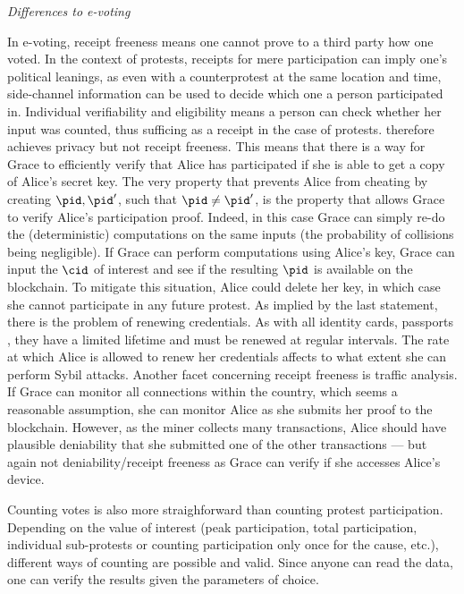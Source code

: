  
\emph{Differences to e-voting}

In e-voting, receipt freeness means one cannot prove to a third party
how one voted. In the context of protests, receipts for mere
participation can imply one's political leanings, as even with a
counterprotest at the same location and time, side-channel information
can be used to decide which one a person participated in. Individual
verifiability and eligibility means a person can check whether her
input was counted, thus sufficing as a receipt in the case of
protests.  \PRIVO therefore achieves privacy but not receipt freeness.
This means that there is a way for Grace to efficiently verify that
Alice has participated if she is able to get a copy of Alice's secret
key. The very property that prevents Alice from cheating by creating
\(\pid, \pid'\), such that \(\pid \neq \pid'\), is the property that
allows Grace to verify Alice's participation proof.  Indeed, in this
case Grace can simply re-do the (deterministic) computations on the
same inputs (the probability of collisions being negligible).  If
Grace can perform computations using Alice's key, Grace can input the
\(\cid\) of interest and see if the resulting \(\pid\) is available on
the blockchain.  To mitigate this situation, Alice could delete her
key, in which case she cannot participate in any future protest.  As
implied by the last statement, there is the problem of renewing
credentials.  As with all identity cards, passports \etc, they have a
limited lifetime and must be renewed at regular intervals.  The rate
at which Alice is allowed to renew her credentials affects to what
extent she can perform Sybil attacks. Another facet concerning receipt
freeness is traffic analysis. If Grace can monitor all connections
within the country, which seems a reasonable assumption, she can
monitor Alice as she submits her proof to the blockchain. However, as
the miner collects many transactions, Alice should have plausible
deniability that she submitted one of the other transactions --- but
again not deniability/receipt freeness as Grace can verify if she
accesses Alice's device.

Counting votes is also more straighforward than counting protest
participation. Depending on the value of interest (peak participation,
total participation, individual sub-protests or counting participation
only once for the cause, etc.), different ways of counting are
possible and valid. Since anyone can read the data, one can verify the
results given the parameters of choice.

